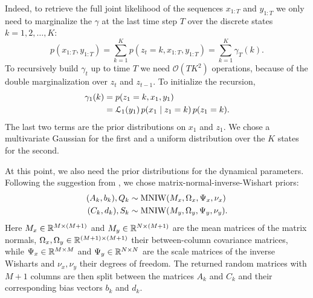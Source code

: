 \documentclass[10pt, twocolumn, headings=small, footlines=1, DIV=calc]{scrartcl}
\begin{document}
Indeed, to retrieve the full joint likelihood of the sequences $x_{1:T}$ and
$y_{1:T}$ we only need to marginalize the $\gamma$ at the last time step $T$
over the discrete states $k = 1, 2, \ldots, K$:
\begin{equation}
  p(x_{1:T}, y_{1:T}) = \sum_{k=1}^{K} p(z_{t} = k, x_{1:T}, y_{1:T})
    = \sum_{k=1}^{K} \gamma_{T} (k).
\end{equation}
To recursively build $\gamma_{t}$ up to time $T$ we need
$\mathcal{O}(TK^{2})$ operations, because of the double marginalization over
$z_{t}$ and $z_{t-1}$. To initialize the recursion,
\begin{equation}
  \begin{split}
    \gamma_{1}(k) &= p(z_{1} = k, x_{1}, y_{1}) \\
                  &= \mathcal{L}_{1}(y_{1}) \,
                    p(x_{1} \;\vert\; z_{1} = k) \, p(z_{1} = k).
  \end{split}
\end{equation}
The last two terms are the prior distributions on $x_{1}$ and $z_{1}$. We chose
a multivariate Gaussian for the first and a uniform distribution over the $K$
states for the second. 

At this point, we also need the prior distributions for the dynamical
parameters. Following the suggestion from \textcite{Linderman17}, we chose
matrix-normal-inverse-Wishart priors:
\begin{align}
  (A_{k}, b_{k}), Q_{k} &\sim \operatorname{MNIW}(M_{x}, \Omega_{x}, \Psi_{x}, \nu_{x}) \\
  (C_{k}, d_{k}), S_{k} &\sim \operatorname{MNIW}(M_{y}, \Omega_{y}, \Psi_{y}, \nu_{y}).
\end{align}
Here $M_{x} \in \mathbb{R}^{M \times (M + 1)}$ and $M_{y} \in \mathbb{R}^{N \times (M + 1)}$ are
the mean matrices of the matrix normals, $\Omega_x, \Omega_y \in \mathbb{R}^{(M + 1)
\times (M + 1)}$ their between-column covariance matrices, while $\Psi_x \in
\mathbb{R}^{M \times M}$ and $\Psi_{y} \in \mathbb{R}^{N \times N}$ are the scale matrices of
the inverse Wisharts and $\nu_{x}, \nu_{y}$ their degrees of freedom. The
returned random matrices with $M + 1$ columns are then split between the
matrices $A_{k}$ and $C_{k}$ and their corresponding bias vectors $b_{k}$ and
$d_{k}$.

\printbibliography
\end{document}

